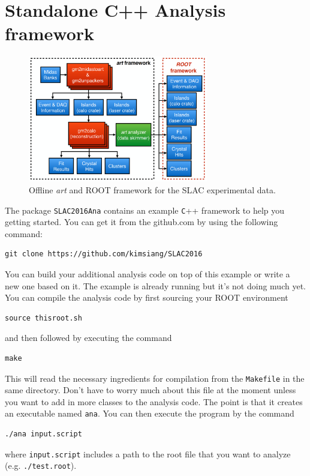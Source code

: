 \chapter{Standalone C++ Analysis framework}
\label{chap:rootframework}

\begin{figure}[htbp]
\centering
\includegraphics[width=0.7\textwidth]{pics/offline_slac_framework}
\caption{Offline \textit{art} and ROOT framework for the SLAC experimental data.}
\end{figure}

The package \verb+SLAC2016Ana+ contains an example \verb+C+++ framework to help you getting started. You can get it from the github.com by using the following command:
%
\begin{Verbatim}[frame=single]
git clone https://github.com/kimsiang/SLAC2016
\end{Verbatim}
%
You can build your additional analysis code on top of this example or write a new one based on it. The example is already running but it's not doing much yet. You can compile the analysis code by first sourcing your ROOT environment
%
\begin{Verbatim}[frame=single]
source thisroot.sh
\end{Verbatim}
%
and then followed by executing the command
\begin{Verbatim}[frame=single]
make
\end{Verbatim}
%
This will read the necessary ingredients for compilation from the \verb+Makefile+ in the same directory. Don't have to worry much about this file at the moment unless you want to add in more classes to the analysis code.
The point is that it creates an executable named \verb+ana+. You can then execute the program by the command 
%
\begin{Verbatim}[frame=single]
./ana input.script
\end{Verbatim}
%
where \verb+input.script+ includes a path to the root file that you want to analyze (e.g. \verb+./test.root+). 

